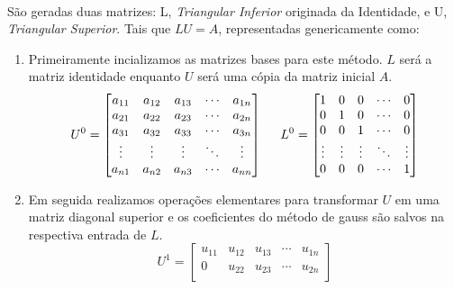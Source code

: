 \documentclass{article}
\begin{document}
        \paragraph{}São geradas duas matrizes: L, \textit{Triangular Inferior} originada da Identidade, e U, \textit{Triangular Superior}. Tais que $LU = A$, representadas genericamente como:
            \begin{enumerate}[noitemsep]
                \item Primeiramente incializamos as matrizes bases para este método. $L$ será a matriz identidade enquanto $U$ será uma cópia da matriz inicial $A$. 
                \[
                U^{0}=
                    \begin{bmatrix}
                        a_{11} & a_{12} & a_{13} & \cdots & a_{1n}\\
                        a_{21} & a_{22} & a_{23} & \cdots & a_{2n}\\
                        a_{31} & a_{32} & a_{33} & \cdots & a_{3n}\\
                        \vdots & \vdots & \vdots & \ddots & \vdots\\
                        a_{n1} & a_{n2} & a_{n3} & \cdots & a_{nn}
                    \end{bmatrix}\hspace{5mm}
                L^{0}=
                    \begin{bmatrix}
                        1      & 0      & 0      & \cdots & 0\\
                        0      & 1      & 0      & \cdots & 0\\
                        0      & 0      & 1      & \cdots & 0\\
                        \vdots & \vdots & \vdots & \ddots & \vdots\\
                        0      & 0      & 0      & \cdots & 1
                    \end{bmatrix}
                \]
                \item Em seguida realizamos operações elementares para transformar $U$ em uma matriz diagonal superior e os coeficientes do método de gauss são salvos na respectiva entrada de $L$.
                \[
                U^{1}=
                    \begin{bmatrix}
                        u_{11} & u_{12} & u_{13} & \cdots & u_{1n}\\
                        0      & u_{22} & u_{23} & \cdots & u_{2n}\\

\end{bmatrix}\]
\end{enumerate}
\end{document}
